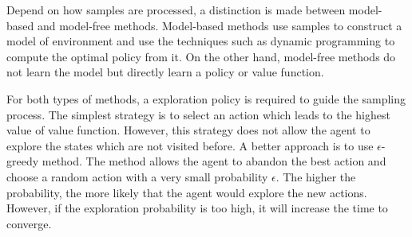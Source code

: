 Depend on how samples are processed, a distinction is made between model-based
and model-free methods. Model-based methods use samples to construct 
a model of environment and use the techniques such as dynamic programming
to compute the optimal policy from it.
On the other hand, model-free methods do not learn the model but directly learn
a policy or value function.

For both types of methods, a exploration policy is required to 
guide the sampling process.
The simplest strategy is to select an action which leads to the highest value of value function. However, 
this strategy does not allow the agent to explore the states which are not visited before.
A better approach is to use $\epsilon$-greedy method. The method allows the agent to abandon the
best action and choose a random action with a very small probability $\epsilon$. The higher the probability, the more
likely that the agent would explore the new actions. However, if the exploration probability 
is too high, it will increase the time to converge.






